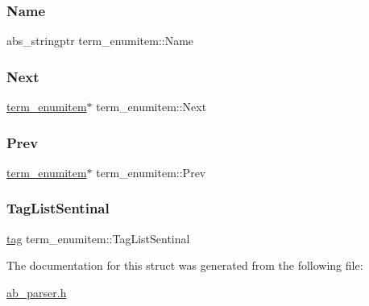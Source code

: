 \subsubsection{\texorpdfstring{Name}{Name}}
{\footnotesize\ttfamily abs\+\_\+stringptr term\+\_\+enumitem\+::\+Name}

\mbox{\label{structterm__enumitem_a76a5df14c05395f4737800d06c23611a}} 
\subsubsection{\texorpdfstring{Next}{Next}}
{\footnotesize\ttfamily \hyperlink{structterm__enumitem}{term\+\_\+enumitem}$\ast$ term\+\_\+enumitem\+::\+Next}

\mbox{\label{structterm__enumitem_a9841d521b128ff1d85936bdfded2e425}} 
\subsubsection{\texorpdfstring{Prev}{Prev}}
{\footnotesize\ttfamily \hyperlink{structterm__enumitem}{term\+\_\+enumitem}$\ast$ term\+\_\+enumitem\+::\+Prev}

\mbox{\label{structterm__enumitem_ace61cab8da4a090548e03c7a9970deb1}} 
\subsubsection{\texorpdfstring{Tag\+List\+Sentinal}{TagListSentinal}}
{\footnotesize\ttfamily \hyperlink{structtag}{tag} term\+\_\+enumitem\+::\+Tag\+List\+Sentinal}



The documentation for this struct was generated from the following file\+:\begin{DoxyCompactItemize}
\item 
\hyperlink{ab__parser_8h}{ab\+\_\+parser.\+h}\end{DoxyCompactItemize}
